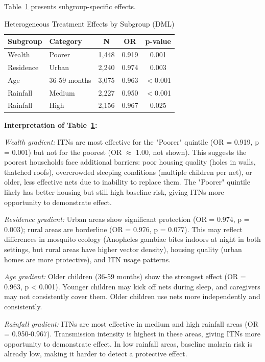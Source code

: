 Table~\ref{tab:heterogeneity_ch4} presents subgroup-specific effects.

\begin{table}[htbp]
	\centering
	\caption{Heterogeneous Treatment Effects by Subgroup (DML)}
	\label{tab:heterogeneity_ch4}
	\begin{tabular}{@{}llccc@{}}
		\toprule
		\textbf{Subgroup} & \textbf{Category} & \textbf{N} & \textbf{OR} & \textbf{p-value} \\
		\midrule
		Wealth & Poorer & 1,448 & 0.919 & 0.001 \\
		Residence & Urban & 2,240 & 0.974 & 0.003 \\
		Age & 36-59 months & 3,075 & 0.963 & $<$0.001 \\
		Rainfall & Medium & 2,227 & 0.950 & $<$0.001 \\
		Rainfall & High & 2,156 & 0.967 & 0.025 \\
		\bottomrule
	\end{tabular}
\end{table}

\textbf{Interpretation of Table~\ref{tab:heterogeneity_ch4}:}

\textit{Wealth gradient:} ITNs are most effective for the "Poorer" quintile (OR = 0.919, p = 0.001) but not for the poorest (OR $\approx$ 1.00, not shown). This suggests the poorest households face additional barriers: poor housing quality (holes in walls, thatched roofs), overcrowded sleeping conditions (multiple children per net), or older, less effective nets due to inability to replace them. The "Poorer" quintile likely has better housing but still high baseline risk, giving ITNs more opportunity to demonstrate effect.

\textit{Residence gradient:} Urban areas show significant protection (OR = 0.974, p = 0.003); rural areas are borderline (OR = 0.976, p = 0.077). This may reflect differences in mosquito ecology (Anopheles gambiae bites indoors at night in both settings, but rural areas have higher vector density), housing quality (urban homes are more protective), and ITN usage patterns.

\textit{Age gradient:} Older children (36-59 months) show the strongest effect (OR = 0.963, p < 0.001). Younger children may kick off nets during sleep, and caregivers may not consistently cover them. Older children use nets more independently and consistently.

\textit{Rainfall gradient:} ITNs are most effective in medium and high rainfall areas (OR = 0.950-0.967). Transmission intensity is highest in these areas, giving ITNs more opportunity to demonstrate effect. In low rainfall areas, baseline malaria risk is already low, making it harder to detect a protective effect.

